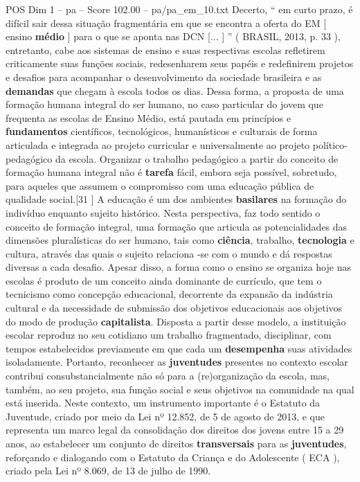 \begin{textsample}{POS Dim 1 – pa – Score 102.00 – pa/pa\_em\_10.txt}
Decerto, “ em curto prazo, é difícil sair dessa situação fragmentária em que se encontra a oferta do EM [ ensino \textbf{médio} ] para o que se aponta nas DCN [... ] ” ( BRASIL, 2013, p. 33 ), entretanto, cabe aos sistemas de ensino e suas respectivas escolas refletirem criticamente suas funções sociais, redesenharem seus papéis e redefinirem projetos e desafios para acompanhar o desenvolvimento da sociedade brasileira e as \textbf{demandas} que chegam à escola todos os dias.
Dessa forma, a proposta de uma formação humana integral do ser humano, no caso particular do jovem que frequenta as escolas de Ensino Médio, está pautada em princípios e \textbf{fundamentos} científicos, tecnológicos, humanísticos e culturais de forma articulada e integrada ao projeto curricular e universalmente ao projeto político-pedagógico da escola.
Organizar o trabalho pedagógico a partir do conceito de formação humana integral não é \textbf{tarefa} fácil, embora seja possível, sobretudo, para aqueles que assumem o compromisso com uma educação pública de qualidade social.[31 ] A educação é um dos ambientes \textbf{basilares} na formação do indivíduo enquanto sujeito histórico.
Nesta perspectiva, faz todo sentido o conceito de formação integral, uma formação que articula as potencialidades das dimensões pluralísticas do ser humano, tais como \textbf{ciência}, trabalho, \textbf{tecnologia} e cultura, através das quais o sujeito relaciona -se com o mundo e dá respostas diversas a cada desafio.
Apesar disso, a forma como o ensino se organiza hoje nas escolas é produto de um conceito ainda dominante de currículo, que tem o tecnicismo como concepção educacional, decorrente da expansão da indústria cultural e da necessidade de submissão dos objetivos educacionais aos objetivos do modo de produção \textbf{capitalista}.
Disposta a partir desse modelo, a instituição escolar reproduz no seu cotidiano um trabalho fragmentado, disciplinar, com tempos estabelecidos previamente em que cada um \textbf{desempenha} suas atividades isoladamente.
Portanto, reconhecer as \textbf{juventudes} presentes no contexto escolar contribui consubstancialmente não só para a (re)organização da escola, mas, também, ao seu projeto, sua função social e seus objetivos na comunidade na qual está inserida.
Neste contexto, um instrumento importante é o Estatuto da Juventude, criado por meio da Lei nº 12.852, de 5 de agosto de 2013, e que representa um marco legal da consolidação dos direitos dos jovens entre 15 a 29 anos, ao estabelecer um conjunto de direitos \textbf{transversais} para as \textbf{juventudes}, reforçando e dialogando com o Estatuto da Criança e do Adolescente ( ECA ), criado pela Lei nº 8.069, de 13 de julho de 1990.

\end{textsample}
